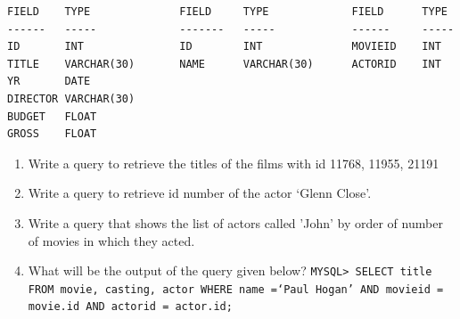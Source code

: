 \documentclass[11pt,a4paper]{article}
\def\AnswerBox{\fbox{\begin{minipage}{4in}\hfill\vspace{0.5in}\end{minipage}}}
\begin{document}
\begin{description}
\begin{verbatim}
FIELD    TYPE              FIELD     TYPE             FIELD      TYPE   
------   -----             -------   -----            ------     -----
ID       INT               ID        INT              MOVIEID    INT
TITLE    VARCHAR(30)       NAME      VARCHAR(30)      ACTORID    INT
YR       DATE
DIRECTOR VARCHAR(30)
BUDGET   FLOAT
GROSS    FLOAT

\end{verbatim}

\begin{enumerate}[label=\bfseries Q\arabic*:]\itemsep10pt
\item Write a query to retrieve the titles of the films with id 11768, 11955, 21191
\item Write a query to retrieve id number of the actor `Glenn Close'.
\item Write a query  that shows the list of actors called 'John' by order of number of movies in which they acted.
\item What will be the output of the query given below?\newline
\texttt{MYSQL> SELECT title FROM movie, casting, actor WHERE name =`Paul Hogan' AND movieid = movie.id AND actorid = actor.id;}
\end{enumerate}


\end{description}
\end{document}
